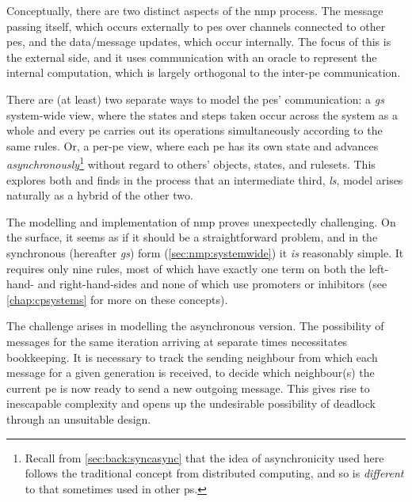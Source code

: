 Conceptually, there are two distinct aspects of the \gls{nmp} process.  The message passing itself, which occurs externally to \glspl{pe} over channels connected to other \glspl{pe}, and the data/message updates, which occur internally.  The focus of this  is the external side, and it uses communication with an oracle to represent the internal computation, which is largely orthogonal to the inter-\gls{pe} communication.

There are (at least) two separate ways to model the \glspl{pe}' communication:  a \emph{\gls{gs}} system-wide view, where the states and steps taken occur across the system as a whole and every \gls{pe} carries out its operations simultaneously according to the same rules.  Or, a per-\gls{pe} view, where each \gls{pe} has its own state and advances \emph{asynchronously}\footnote{Recall from \vref{sec:back:syncasync} that the idea of asynchronicity used here follows the traditional concept from distributed computing, and so is \emph{different} to that sometimes used in other \gls{ps}.} without regard to others' objects, states, and rulesets.  This  explores both and finds in the process that an intermediate third, \emph{\gls{ls}}, model arises naturally as a hybrid of the other two.

The modelling and implementation of \gls{nmp} proves unexpectedly challenging.  On the surface, it seems as if it should be a straightforward problem, and in the synchronous (hereafter \emph{\gls{gs}}) form (\cref{sec:nmp:systemwide}) it \emph{is} reasonably simple.  It requires only nine rules, most of which have exactly one term on both the left-hand- and right-hand-sides and none of which use promoters or inhibitors (see \cref{chap:cpsystems} for more on these concepts).


The challenge arises in modelling the asynchronous version.  The possibility of messages for the same iteration arriving at separate times necessitates bookkeeping.  It is necessary to track the sending neighbour from which each message for a given generation is received, to decide which neighbour(s) the current \gls{pe} is now ready to send a new outgoing message.  This gives rise to inescapable complexity and opens up the undesirable possibility of deadlock through an unsuitable design.

